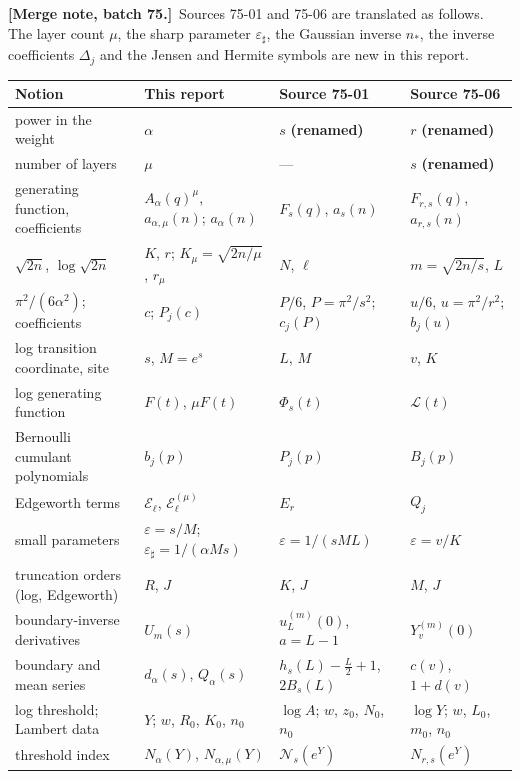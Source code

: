 \documentclass[11pt]{article}
\numberwithin{equation}{section}
\theoremstyle{definition}\newtheorem{definition}[theorem]{Definition}
\theoremstyle{remark}\newtheorem{remark}[theorem]{Remark}
\newcommand{\eps}{\varepsilon}
\newcommand{\mergenoteb}[1]{\par\smallskip\noindent\textbf{[Merge note, batch 75.]}\ #1\par\smallskip}
\newcommand{\epsh}{\varepsilon_{\sharp}}
\begin{document}
\mergenoteb{Sources 75-01 and 75-06 are translated as follows.  The
layer count $\mu$, the sharp parameter $\epsh$, the Gaussian inverse
$n_*$, the inverse coefficients $\Delta_j$ and the Jensen and Hermite
symbols are new in this report.}
\begin{center}
\small
\begin{tabular}{>{\raggedright\arraybackslash}p{3.5cm}>{\raggedright\arraybackslash}p{3.5cm}>{\raggedright\arraybackslash}p{3.0cm}>{\raggedright\arraybackslash}p{3.2cm}}
\toprule
Notion & This report & Source 75-01 & Source 75-06\\
\midrule
power in the weight & $\alpha$ & $s$ \textbf{(renamed)} & $r$ \textbf{(renamed)}\\
number of layers & $\mu$ & --- & $s$ \textbf{(renamed)}\\
generating function, coefficients & $A_\alpha(q)^\mu$, $a_{\alpha,\mu}(n)$; $a_\alpha(n)$ & $F_s(q)$, $a_s(n)$ & $F_{r,s}(q)$, $a_{r,s}(n)$\\
$\sqrt{2n}$, $\log\sqrt{2n}$ & $K$, $r$; $K_\mu=\sqrt{2n/\mu}$, $r_\mu$ & $N$, $\ell$ & $m=\sqrt{2n/s}$, $L$\\
$\pi^2/(6\alpha^2)$; coefficients & $c$; $P_j(c)$ & $P/6$, $P=\pi^2/s^2$; $c_j(P)$ & $u/6$, $u=\pi^2/r^2$; $b_j(u)$\\
log transition coordinate, site & $s$, $M=e^s$ & $L$, $M$ & $v$, $K$\\
log generating function & $F(t)$, $\mu F(t)$ & $\Phi_s(t)$ & $\mathcal L(t)$\\
Bernoulli cumulant polynomials & $b_j(p)$ & $P_j(p)$ & $B_j(p)$\\
Edgeworth terms & $\mathcal E_\ell$, $\mathcal E^{(\mu)}_\ell$ & $E_r$ & $Q_j$\\
small parameters & $\eps=s/M$; $\epsh=1/(\alpha Ms)$ & $\eps=1/(sML)$ & $\eps=v/K$\\
truncation orders (log, Edgeworth) & $R$, $J$ & $K$, $J$ & $M$, $J$\\
boundary-inverse derivatives & $U_m(s)$ & $u_L^{(m)}(0)$, $a=L-1$ & $Y_v^{(m)}(0)$\\
boundary and mean series & $d_\alpha(s)$, $Q_\alpha(s)$ & $h_s(L)-\frac L2+1$, $2B_s(L)$ & $c(v)$, $1+d(v)$\\
log threshold; Lambert data & $Y$; $w$, $R_0$, $K_0$, $n_0$ & $\log A$; $w$, $z_0$, $N_0$, $n_0$ & $\log Y$; $w$, $L_0$, $m_0$, $n_0$\\
threshold index & $N_\alpha(Y)$, $N_{\alpha,\mu}(Y)$ & $\mathcal N_s(e^Y)$ & $N_{r,s}(e^Y)$\\

\end{tabular}
\end{center}
\end{document}
